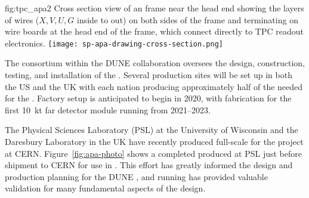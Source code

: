 \begin{dunefigure}{fig:tpc_apa2}
{Cross section view of an  frame near the head end showing the layers of wires ($X,V,U,G$ inside to out) on both sides of the frame and terminating on wire boards at the head end of the frame, which connect directly to TPC readout electronics.} 
\texttt{[image: sp-apa-drawing-cross-section.png]} 
\end{dunefigure} 


The  consortium within the DUNE collaboration oversees the design, construction, testing, and installation of the . Several  production sites will be set up in both the US and the UK with each nation producing approximately half of the  needed for the %
.  Factory setup is anticipated to begin in 2020, with  fabrication for the first \SI{10}{kt} far detector module running from 2021--2023.  

The Physical Sciences Laboratory (PSL) at the University of Wisconsin and the Daresbury Laboratory in the UK have recently produced full-scale  for the  project at CERN. Figure~\ref{fig:apa-photo} shows a completed  produced at PSL just before shipment to CERN for use in . This effort has greatly informed the design and production planning for the DUNE , and  running has provided valuable validation for many fundamental aspects of the   design. 


